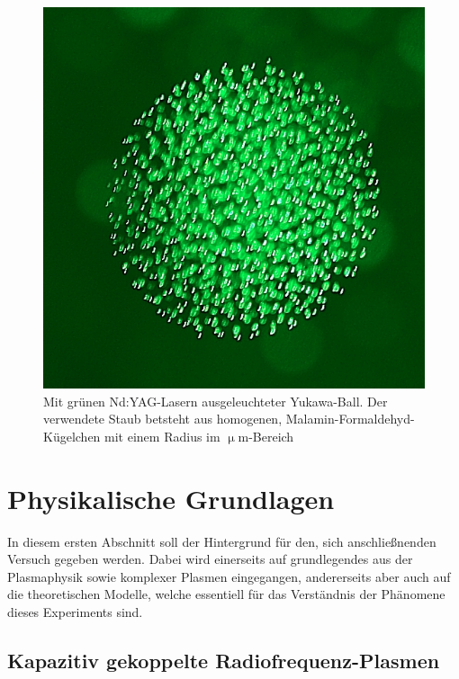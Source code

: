 \documentclass[numbers=noenddot,a4paper,notitlepage,twoside,BCOR15mm]{scrbook}
\begin{document}
		\begin{figure}[!h]
		\centering
			\begin{minipage}{0.49\textwidth}
				\centering
				\includegraphics[scale=1.25]{figs/cluster.png}
			\end{minipage}
			\begin{minipage}{0.48\textwidth}
				\caption{Mit grünen Nd:YAG-Lasern ausgeleuchteter Yukawa-Ball. Der verwendete Staub  betsteht aus homogenen, Malamin-Formaldehyd-Kügelchen mit einem Radius im $\upmu$m-Bereich}
			\end{minipage}
		\end{figure}

	\chapter{Physikalische Grundlagen}\label{sec:physg}

		In diesem ersten Abschnitt soll der Hintergrund f\"ur den, sich anschlie{\ss}nenden Versuch gegeben werden. Dabei wird einerseits auf grundlegendes aus der Plasmaphysik sowie komplexer Plasmen eingegangen, andererseits aber auch auf die theoretischen Modelle, welche essentiell f\"ur das Verst\"andnis der Ph\"anomene dieses Experiments sind.

		\section{Kapazitiv gekoppelte Radiofrequenz-Plasmen} \label{sub:kaprfplasm}
\end{document}
